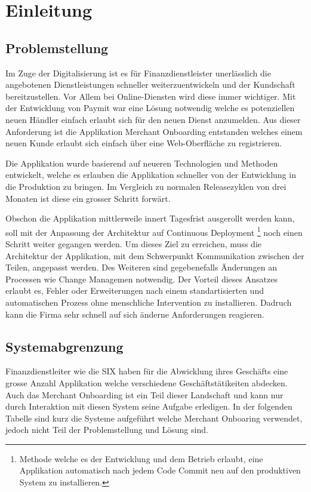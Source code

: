 \chapter{Einleitung}

\section{Problemstellung}

Im Zuge der Digitalisierung ist es für Finanzdienstleister unerlässlich die angebotenen Dienstleistungen schneller weiterzuentwickeln und der Kundschaft bereitzustellen. Vor Allem bei Online-Diensten wird diese immer wichtiger. Mit der Entwicklung von Paymit war eine Lösung notwendig welche es potenziellen neuen Händler einfach erlaubt sich für den neuen Dienst anzumelden. Aus dieser Anforderung ist die Applikation Merchant Onboarding entstanden welches einem neuen Kunde erlaubt sich einfach über eine Web-Oberfläche zu registrieren.

Die Applikation wurde basierend auf neueren Technologien und Methoden entwickelt, welche es erlauben die Applikation schneller von der Entwicklung in die Produktion zu bringen. Im Vergleich zu normalen Releasezyklen von drei Monaten ist diese ein grosser Schritt forwärt.

Obschon die Applikation mittlerweile innert Tagesfrist ausgerollt werden kann, soll mit der Anpassung der Architektur auf Continuous Deployment \footnote{Methode welche es der Entwicklung und dem Betrieb erlaubt, eine Applikation automatisch nach jedem Code Commit neu auf den produktiven System zu installieren.} noch einen Schritt weiter gegangen werden. Um dieses Ziel zu erreichen, muss die Architektur der Applikation, mit dem Schwerpunkt Kommunikation zwischen der Teilen, angepasst werden. Des Weiteren sind gegebenefalls Änderungen an Processen wie Change Managemen notwendig.
Der Vorteil dieses Ansatzes erlaubt es, Fehler oder Erweiterungen nach einem standartisierten und automatischen Prozess ohne menschliche Intervention zu installieren. Dadruch kann die Firma sehr schnell auf sich änderne Anforderungen reagieren.


\section{Systemabgrenzung}

Finanzdienstleiter wie die SIX haben für die Abwicklung ihres Geschäfts eine grosse Anzahl Applikation welche verschiedene Geschäftstätikeiten abdecken. Auch das Merchant Onboarding ist ein Teil dieser Landschaft und kann nur durch Interaktion mit diesen System seine Aufgabe erledigen. In der folgenden Tabelle sind kurz die Systeme aufgeführt welche Merchant Onboaring verwendet, jedoch nicht Teil der Problemstellung und Lösung sind.

